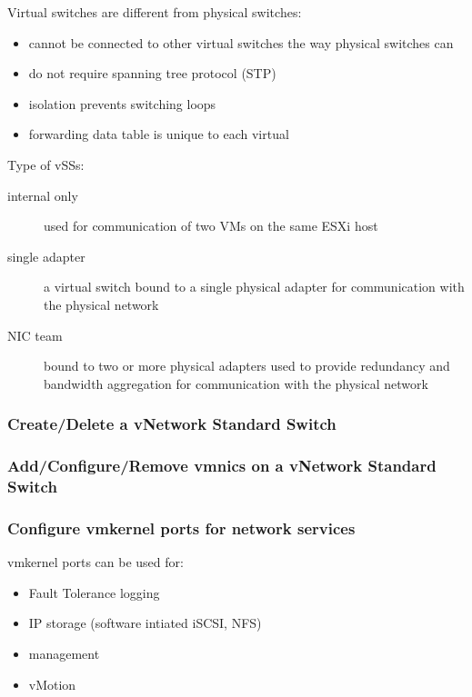 Virtual switches are different from physical switches:

\begin{itemize}
\item cannot be connected to other virtual switches the way physical switches can
\item do not require spanning tree protocol (STP)
\item isolation prevents switching loops
\item forwarding data table is unique to each virtual
\end{itemize}

Type of vSSs:

\begin{description}

\item[internal only]
used for communication of two VMs on the same ESXi host

\item[single adapter]
a virtual switch bound to a single physical adapter for communication
with the physical network

\item[NIC team]
bound to two or more physical adapters used to provide redundancy and bandwidth
aggregation for communication with the physical network

\end{description}

\subsubsection{Create/Delete a vNetwork Standard Switch}

\subsubsection{Add/Configure/Remove vmnics on a vNetwork Standard Switch}

\subsubsection{Configure vmkernel ports for network services}

vmkernel ports can be used for:

\begin{itemize}
\item Fault Tolerance logging
\item IP storage (software intiated iSCSI, NFS)
\item management
\item vMotion
\end{itemize}

